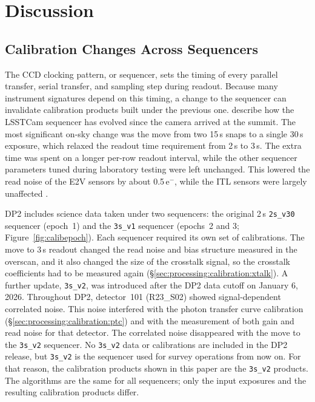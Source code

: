 \section{Discussion} \label{sec:discussion}

\subsection{Calibration Changes Across Sequencers} \label{sec:discussion:sequencers}
The CCD clocking pattern, or sequencer, sets the timing of every parallel transfer, serial transfer, and sampling step during readout.
Because many instrument signatures depend on this timing, a change to the sequencer can invalidate calibration products built under the previous one.
\citet{2026arXiv260631806M} describe how the LSSTCam sequencer has evolved since the camera arrived at the summit.
The most significant on-sky change was the move from two 15\,s snaps to a single 30\,s exposure, which relaxed the readout time requirement from 2\,s to 3\,s.
The extra time was spent on a longer per-row readout interval, while the other sequencer parameters tuned during laboratory testing were left unchanged.
This lowered the read noise of the E2V sensors by about 0.5\,e$^-$, while the ITL sensors were largely unaffected \citep{2026arXiv260631806M}.

DP2 includes science data taken under two sequencers: the original 2\,s \texttt{2s\_v30} sequencer (epoch~1) and the \texttt{3s\_v1} sequencer (epochs~2 and 3; Figure~\ref{fig:calibepoch}).
Each sequencer required its own set of calibrations.
The move to 3\,s readout changed the read noise and bias structure measured in the overscan, and it also changed the size of the crosstalk signal, so the crosstalk coefficients had to be measured again (\S\ref{sec:processing:calibration:xtalk}).
A further update, \texttt{3s\_v2}, was introduced after the DP2 data cutoff on January 6, 2026.
Throughout DP2, detector~101 (R23\_S02) showed signal-dependent correlated noise.
This noise interfered with the photon transfer curve calibration (\S\ref{sec:processing:calibration:ptc}) and with the measurement of both gain and read noise for that detector.
The correlated noise disappeared with the move to the \texttt{3s\_v2} sequencer.
No \texttt{3s\_v2} data or calibrations are included in the DP2 release, but \texttt{3s\_v2} is the sequencer used for survey operations from now on.
For that reason, the calibration products shown in this paper are the \texttt{3s\_v2} products.
The algorithms are the same for all sequencers; only the input exposures and the resulting calibration products differ.


